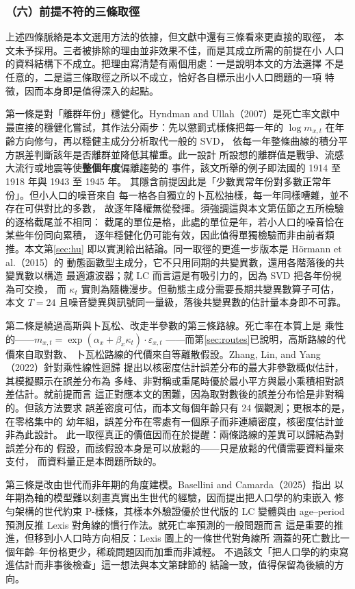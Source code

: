 \documentclass[UTF8, fontset=macnew, a4paper, 12pt]{ctexart}
\begin{document}
\subsubsection{（六）前提不符的三條取徑}\label{sec:notapply}

上述四條脈絡是本文選用方法的依據，但文獻中還有三條看來更直接的取徑，
本文未予採用。三者被排除的理由並非效果不佳，而是其成立所需的前提在小
人口的資料結構下不成立。把理由寫清楚有兩個用處：一是說明本文的方法選擇
不是任意的，二是這三條取徑之所以不成立，恰好各自標示出小人口問題的一項
特徵，因而本身即是值得深入的起點。

第一條是對「離群年份」穩健化。Hyndman and Ullah（2007）是死亡率文獻中
最直接的穩健化嘗試，其作法分兩步：先以懲罰式樣條把每一年的
$\log m_{x,t}$ 在年齡方向修勻，再以穩健主成分分析取代一般的 SVD，
依每一年整條曲線的積分平方誤差判斷該年是否離群並降低其權重。此一設計
所設想的離群值是戰爭、流感大流行或地震等使\textbf{整個年度}偏離趨勢的
事件，該文所舉的例子即法國的 1914 至 1918 年與 1943 至 1945 年。
其隱含前提因此是「少數異常年份對多數正常年份」。但小人口的噪音來自
每一格各自獨立的卜瓦松抽樣，每一年同樣嘈雜，並不存在可供對比的多數，
故逐年降權無從發揮。須強調這與本文第伍節之五所檢驗的逐格截尾並不相同：
截尾的單位是格，此處的單位是年，若小人口的噪音恰在某些年份同向累積，
逐年穩健化仍可能有效，因此值得單獨檢驗而非由前者類推。本文第\ref{sec:hu}
即以實測給出結論。同一取徑的更進一步版本是 Hörmann et al.（2015）的
動態函數型主成分，它不只用同期的共變異數，還用各階落後的共變異數以構造
最適濾波器；就 LC 而言這是有吸引力的，因為 SVD 把各年份視為可交換，
而 $\kappa_t$ 實則為隨機漫步。但動態主成分需要長期共變異數算子可估，
本文 $T=24$ 且噪音變異與訊號同一量級，落後共變異數的估計量本身即不可靠。

第二條是繞過高斯與卜瓦松、改走半參數的第三條路線。死亡率在本質上是
乘性的——$m_{x,t}=\exp(\alpha_x+\beta_x\kappa_t)\cdot\varepsilon_{x,t}$
——而第\ref{sec:routes}已說明，高斯路線的代價來自取對數、
卜瓦松路線的代價來自等離散假設。Zhang, Lin, and Yang（2022）針對乘性線性迴歸
提出以核密度估計誤差分布的最大非參數概似估計，其模擬顯示在誤差分布為
多峰、非對稱或重尾時優於最小平方與最小乘積相對誤差估計。就前提而言
這正對應本文的困難，因為取對數後的誤差分布恰是非對稱的。但該方法要求
誤差密度可估，而本文每個年齡只有 24 個觀測；更根本的是，在零格集中的
幼年組，誤差分布在零處有一個原子而非連續密度，核密度估計並非為此設計。
此一取徑真正的價值因而在於提醒：兩條路線的差異可以歸結為對誤差分布的
假設，而該假設本身是可以放鬆的——只是放鬆的代價需要資料量來支付，
而資料量正是本問題所缺的。

第三條是改由世代而非年期的角度建模。Basellini and Camarda（2025）指出
以年期為軸的模型難以刻畫真實出生世代的經驗，因而提出把人口學的約束嵌入
修勻架構的世代約束 P-樣條，其樣本外驗證優於世代版的 LC 變體與由
age--period 預測反推 Lexis 對角線的慣行作法。就死亡率預測的一般問題而言
這是重要的推進，但移到小人口時方向相反：Lexis 圖上的一條世代對角線所
涵蓋的死亡數比一個年齡--年份格更少，稀疏問題因而加重而非減輕。
不過該文「把人口學的約束寫進估計而非事後檢查」這一想法與本文第肆節的
結論一致，值得保留為後續的方向。
\end{document}
